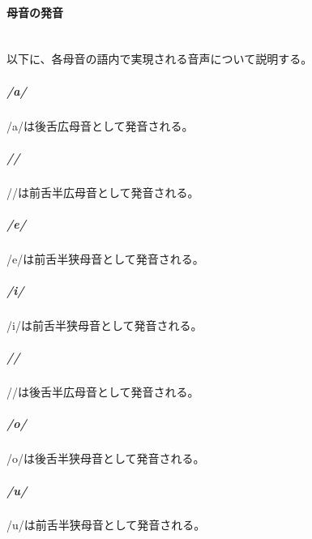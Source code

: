 \paragraph{母音の発音}\quad\\
以下に、各母音の語内で実現される音声について説明する。

\subparagraph{/a/}
/a/は後舌広母音\textipa{[A]}として発音される。

\subparagraph{//}
//は前舌半広母音\textipa{[E]}として発音される。

\subparagraph{/e/}
/e/は前舌半狭母音\textipa{[e]}として発音される。

\subparagraph{/i/}
/i/は前舌半狭母音\textipa{[i]}として発音される。

\subparagraph{//}
//は後舌半広母音\textipa{[O]}として発音される。

\subparagraph{/o/}
/o/は後舌半狭母音\textipa{[o]}として発音される。

\subparagraph{/u/}
/u/は前舌半狭母音\textipa{[u]}として発音される。
